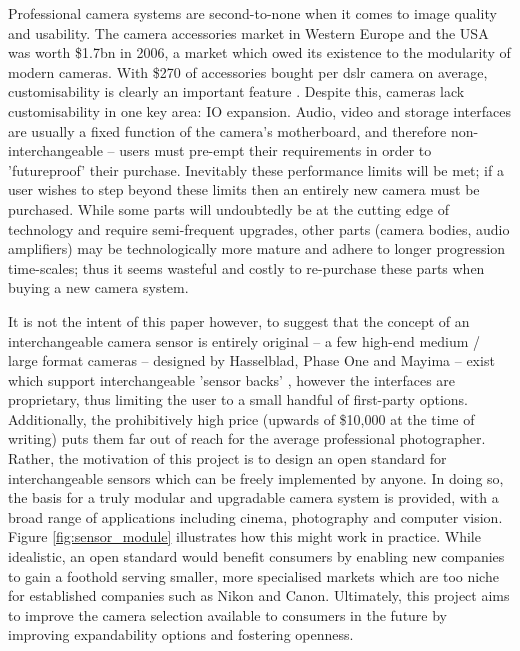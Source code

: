 Professional camera systems are second-to-none when it comes to image quality and usability. The camera accessories market in Western Europe and the USA was worth \$1.7bn in 2006, a market which owed its existence to the modularity of modern cameras. With \$270 of accessories bought per \gls{dslr} camera on average, customisability is clearly an important feature \cite{9_understanding_and_solutions_2007}. Despite this, cameras lack customisability in one key area: IO expansion. Audio, video and storage interfaces are usually a fixed function of the camera's motherboard, and therefore non-interchangeable -- users must pre-empt their requirements in order to 'futureproof' their purchase. Inevitably these performance limits will be met; if a user wishes to step beyond these limits then an entirely new camera must be purchased. While some parts will undoubtedly be at the cutting edge of technology and require semi-frequent upgrades, other parts (camera bodies, audio amplifiers) may be technologically more mature and adhere to longer progression time-scales; thus it seems wasteful and costly to re-purchase these parts when buying a new camera system.

It is not the intent of this paper however, to suggest that the concept of an interchangeable camera sensor is entirely original -- a few high-end medium / large format cameras -- designed by Hasselblad, Phase One and Mayima -- exist which support interchangeable 'sensor backs' , however the interfaces are proprietary, thus limiting the user to a small handful of first-party options. Additionally, the prohibitively high price (upwards of \$10,000 at the time of writing) puts them far out of reach for the average professional photographer. Rather, the motivation of this project is to design an open standard for interchangeable sensors which can be freely implemented by anyone. In doing so, the basis for a truly modular and upgradable camera system is provided, with a broad range of applications including cinema, photography and computer vision. Figure \ref{fig:sensor_module} illustrates how this might work in practice. While idealistic, an open standard would benefit consumers by enabling new companies to gain a foothold serving smaller, more specialised markets which are too niche for established companies such as Nikon and Canon. Ultimately, this project aims to improve the camera selection available to consumers in the future by improving expandability options and fostering openness.

